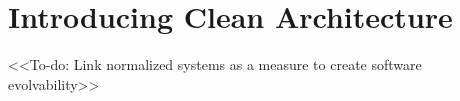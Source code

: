 \section{Introducing Clean Architecture}
<<To-do: Link normalized systems as a measure to create software evolvability>>